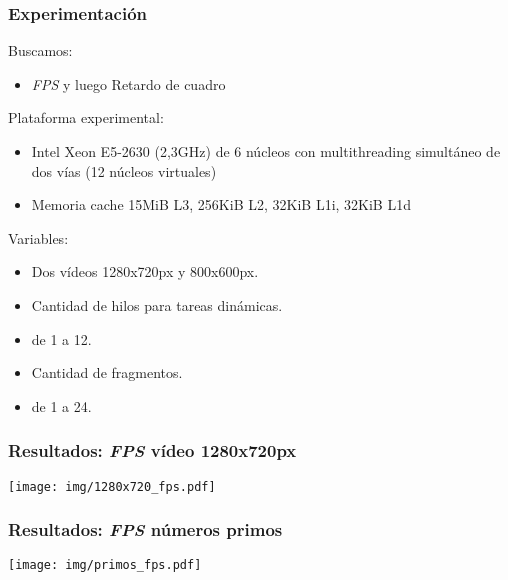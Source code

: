\documentclass[11pt,a4paper,spanish]{beamer}
\begin{document}
\begin{frame}

\frametitle{Experimentación}

Buscamos:

\begin{itemize}

	\item \emph{FPS} y luego Retardo de cuadro

\end{itemize}

Plataforma experimental:

\begin{itemize}

	\item Intel Xeon E5-2630 (2,3GHz) de 6 núcleos con multithreading
		simultáneo de dos vías (12 núcleos virtuales)

	\item Memoria cache 15MiB L3, 256KiB L2, 32KiB L1i, 32KiB L1d

\end{itemize}

Variables:

\begin{itemize}

	\item Dos vídeos 1280x720px y 800x600px.

	\item Cantidad de hilos para tareas dinámicas.

	\item de 1 a 12.

	\item Cantidad de fragmentos.

	\item de 1 a 24.

\end{itemize}

\end{frame}

\begin{frame}

\frametitle{Resultados: \emph{FPS} vídeo 1280x720px}

\texttt{[image: img/1280x720\_fps.pdf]}

\end{frame}

\begin{frame}

\frametitle{Resultados: \emph{FPS} números primos}

\texttt{[image: img/primos\_fps.pdf]}

\end{frame}
\end{document}
